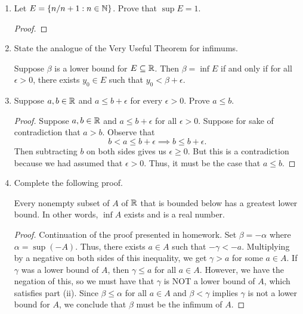 \documentclass[11pt,a4paper]{article}
\begin{document}
\begin{enumerate}
\item Let \( E  = \{ n / n + 1 : n \in \mathbb{N}  \}  \). Prove that \( \sup E  = 1  \). 
    \begin{proof}
    
    \end{proof}

\item State the analogue of the Very Useful Theorem for infimums. 
        \begin{solution}
        Suppose \( \beta  \) is a lower bound for \( E \subseteq \mathbb{R}    \). Then \( \beta = \inf E  \) if and only if for all \( \epsilon > 0  \), there exists \( {y}_{0} \in E  \) such that \( {y}_{0} < \beta + \epsilon  \).
        \end{solution}
    \item Suppose \( a,b \in \mathbb{R}  \) and \( a \leq b + \epsilon  \) for every \( \epsilon > 0  \). Prove \( a \leq b  \). \label{Problem 5}
        \begin{proof}
        Suppose \( a, b \in \mathbb{R}  \) and \( a \leq b + \epsilon  \) for all \( \epsilon > 0  \). Suppose for sake of contradiction that \(  a > b  \). Observe that 
        \[  b < a \leq b + \epsilon \implies b \leq b + \epsilon. \]
        Then subtracting \( b  \) on both sides gives us \( \epsilon \geq 0  \). But this is a contradiction because we had assumed that \( \epsilon > 0 \). Thus, it must be the case that \( a \leq b  \).
        \end{proof}
    \item Complete the following proof.   
\begin{theorem}
   Every nonempty subset of \( A  \) of \( \mathbb{R}  \) that is bounded below has a greatest lower bound. In other words, \( \inf A  \) exists and is a real number.   
\end{theorem}
\begin{proof}
Continuation of the proof presented in homework. Set \( \beta = - \alpha  \) where \(  \alpha  = \sup (-A )   \). Thus, there exists \( a \in A  \) such that \( - \gamma < - a  \). Multiplying by a negative on both sides of this inequality, we get \(  \gamma > a  \) for some \( a \in A  \). If \( \gamma  \) was a lower bound of \( A  \), then \( \gamma \leq a   \) for all \( a \in A  \). However, we have the negation of this, so we must have that \( \gamma  \) is NOT a lower bound of \( A  \), which satisfies part (ii). Since \( \beta \leq \alpha  \) for all \( a \in A  \) and \( \beta < \gamma  \) implies \( \gamma  \) is not a lower bound for \( A  \), we conclude that \( \beta  \) must be the infimum of \( A  \).  

\end{proof}
\end{enumerate}
\end{document}
